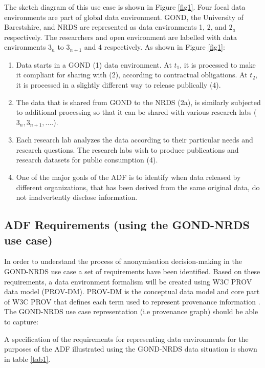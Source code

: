 The sketch diagram of this use case is shown in Figure \ref{fig1}. Four focal data environments are part of global data environment. GOND, the University of Barestshire, and NRDS are represented as data environments 1, 2, and \begin{math}2_{a}\end{math}  respectively. The researchers and open environment are labelled with data environments \begin{math} 3_{n} \end{math} to \begin{math}3_{n+1} \end{math} and 4 respectively. As shown in Figure \ref{fig1}:
\begin{enumerate}
    \item Data starts in a GOND (1) data environment. At $t_1$, it is processed to make it compliant for sharing with (2), according to contractual obligations. At $t_2$, it is processed in a slightly different way to release publically (4).
    \item The data that is shared from GOND to the NRDS (2a), is similarly subjected to additional processing so that it can be shared with various research labs ($3_n,3_{n+1},....$).
    \item Each research lab analyzes the data according to their particular needs and research questions. The research labs wish to produce publications and research datasets for public consumption (4).
    \item One of the major goals of the ADF is to identify when data released by different organizations, that has been derived from the same original data, do not inadvertently disclose information.
\end{enumerate}


\subsection{ADF Requirements (using the GOND-NRDS use case)}
In order to understand the process of anonymisation decision-making in the GOND-NRDS use case a set of requirements have been identified. Based on these requirements, a data environment formalism will be created using W3C PROV data model (PROV-DM). PROV-DM is the conceptual data model and core part of W3C PROV that defines each term used to represent provenance information \cite{moreau2015rationale}.
The GOND-NRDS use case representation (i.e provenance graph) should be able to capture:

A specification of the requirements for representing data environments for the purposes of the ADF illustrated using the GOND-NRDS data situation is shown in table \ref{tab1}.

